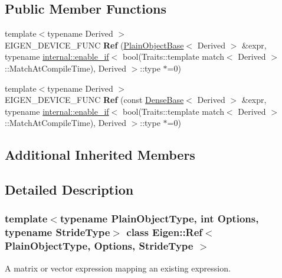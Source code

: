 \subsection*{Public Member Functions}
\begin{DoxyCompactItemize}
\item 
\mbox{\label{class_eigen_1_1_ref_ae7a23f780380e4156b4d8da112c224ff}} 
{\footnotesize template$<$typename Derived $>$ }\\E\+I\+G\+E\+N\+\_\+\+D\+E\+V\+I\+C\+E\+\_\+\+F\+U\+NC {\bfseries Ref} (\mbox{\hyperlink{class_eigen_1_1_plain_object_base}{Plain\+Object\+Base}}$<$ Derived $>$ \&expr, typename \mbox{\hyperlink{struct_eigen_1_1internal_1_1enable__if}{internal\+::enable\+\_\+if}}$<$ bool(Traits\+::template match$<$ Derived $>$\+::Match\+At\+Compile\+Time), Derived $>$\+::type $\ast$=0)
\item 
\mbox{\label{class_eigen_1_1_ref_a987be4372b43f21d520ee9f48b28d7f3}} 
{\footnotesize template$<$typename Derived $>$ }\\E\+I\+G\+E\+N\+\_\+\+D\+E\+V\+I\+C\+E\+\_\+\+F\+U\+NC {\bfseries Ref} (const \mbox{\hyperlink{class_eigen_1_1_dense_base}{Dense\+Base}}$<$ Derived $>$ \&expr, typename \mbox{\hyperlink{struct_eigen_1_1internal_1_1enable__if}{internal\+::enable\+\_\+if}}$<$ bool(Traits\+::template match$<$ Derived $>$\+::Match\+At\+Compile\+Time), Derived $>$\+::type $\ast$=0)
\end{DoxyCompactItemize}
\subsection*{Additional Inherited Members}


\subsection{Detailed Description}
\subsubsection*{template$<$typename Plain\+Object\+Type, int Options, typename Stride\+Type$>$\newline
class Eigen\+::\+Ref$<$ Plain\+Object\+Type, Options, Stride\+Type $>$}

A matrix or vector expression mapping an existing expression. 


